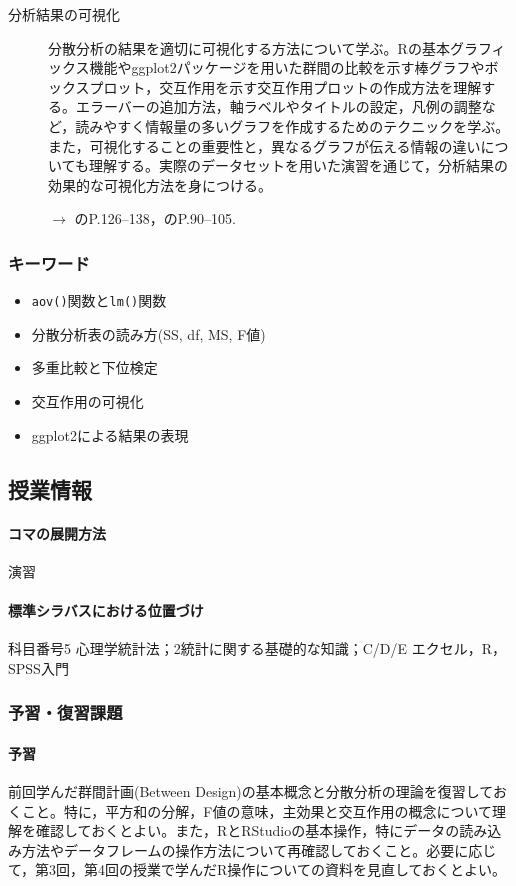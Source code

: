 \begin{description}
	\item[分析結果の可視化] 分散分析の結果を適切に可視化する方法について学ぶ。Rの基本グラフィックス機能やggplot2パッケージを用いた群間の比較を示す棒グラフやボックスプロット，交互作用を示す交互作用プロットの作成方法を理解する。エラーバーの追加方法，軸ラベルやタイトルの設定，凡例の調整など，読みやすく情報量の多いグラフを作成するためのテクニックを学ぶ。また，可視化することの重要性と，異なるグラフが伝える情報の違いについても理解する。実際のデータセットを用いた演習を通じて，分析結果の効果的な可視化方法を身につける。
	      \begin{flushright}
		      $\to$ \textcite{Kinosady2021}のP.126--138，\textcite{kosugi2019}のP.90--105.
	      \end{flushright}

\end{description}
\subsubsection{キーワード}
\begin{itemize}
	\item \verb|aov()|関数と\verb|lm()|関数
	\item 分散分析表の読み方(SS, df, MS, F値)
	\item 多重比較と下位検定
	\item 交互作用の可視化
	\item ggplot2による結果の表現
\end{itemize}
\subsection{授業情報}
\paragraph{コマの展開方法}
演習
\paragraph{標準シラバスにおける位置づけ}
科目番号5 心理学統計法；2統計に関する基礎的な知識；C/D/E エクセル，R，SPSS入門
\subsubsection{予習・復習課題}
\paragraph{予習}
前回学んだ群間計画(Between Design)の基本概念と分散分析の理論を復習しておくこと。特に，平方和の分解，F値の意味，主効果と交互作用の概念について理解を確認しておくとよい。また，RとRStudioの基本操作，特にデータの読み込み方法やデータフレームの操作方法について再確認しておくこと。必要に応じて，第3回，第4回の授業で学んだR操作についての資料を見直しておくとよい。

